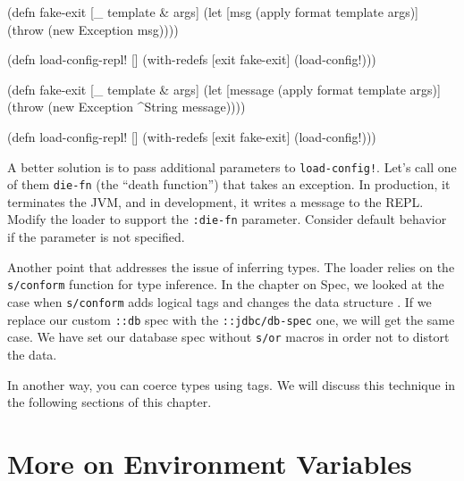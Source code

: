 \ifnarrow

\begin{english}
  \begin{clojure}
(defn fake-exit
  [_ template & args]
  (let [msg (apply format template args)]
    (throw (new Exception msg))))

(defn load-config-repl! []
  (with-redefs [exit fake-exit]
    (load-config!)))
  \end{clojure}
\end{english}

\else

\begin{english}
  \begin{clojure}
(defn fake-exit
  [_ template & args]
  (let [message (apply format template args)]
    (throw (new Exception ^String message))))

(defn load-config-repl! []
  (with-redefs [exit fake-exit]
    (load-config!)))
  \end{clojure}
\end{english}

\fi


A better solution is to pass additional parameters to \texttt{load-config!}. Let's call one of them \verb|die-fn| (the ``death function'') that takes an exception. In production, it terminates the JVM, and in development, it writes a message to the REPL. Modify the loader to support the \verb|:die-fn| parameter. Consider default behavior if the parameter is not specified.

Another point that addresses the issue of inferring types. The loader relies on the \verb|s/conform| function for type inference. In the chapter on Spec, we looked at the case when \verb|s/conform| adds logical tags and changes the data structure . If we replace our custom \verb|::db| spec with the \verb|::jdbc/db-spec| one, we will get the same case. We have set our database spec without \verb|s/or| macros in order not to distort the data.


In another way, you can coerce types using tags. We will discuss this technique in the following sections of this chapter.

\section{More on Environment Variables}

